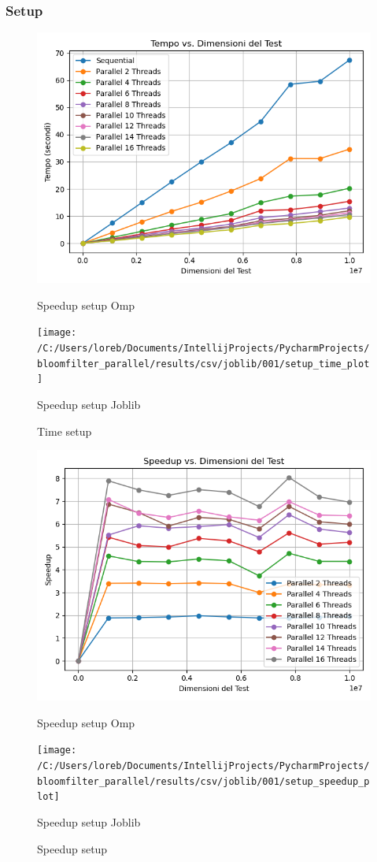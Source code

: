 \documentclass[11pt]{article}
\begin{document}
    \subsubsection{Setup}\label{subsubsec:setup}
    \begin{figure}[H]
        \centering
        \includegraphics[width=\linewidth]{omp/001/setup_time_plot}
            \caption{Speedup setup Omp}\label{fig:setup_time_omp}
        \endminipage\hfill
        \texttt{[image: /C:/Users/loreb/Documents/IntellijProjects/PycharmProjects/bloomfilter\_parallel/results/csv/joblib/001/setup\_time\_plot]}
            \caption{Speedup setup Joblib}\label{fig:setup_time_joblib}
        \endminipage\hfill
        \caption{Time setup}
    \end{figure}
    \begin{figure}[H]
        \centering
        \includegraphics[width=\linewidth]{omp/001/setup_speedup_plot}
            \caption{Speedup setup Omp}\label{fig:setup_speedup_omp}
        \endminipage\hfill
        \texttt{[image: /C:/Users/loreb/Documents/IntellijProjects/PycharmProjects/bloomfilter\_parallel/results/csv/joblib/001/setup\_speedup\_plot]}
            \caption{Speedup setup Joblib}\label{fig:setup_speedup_joblib}
        \endminipage\hfill
        \caption{Speedup setup}
    \end{figure}
\end{document}
